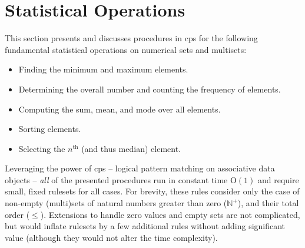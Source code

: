 

\section{Statistical Operations}\label{sec:cps:stats}

This section presents and discusses procedures in \gls{cps} for the following fundamental statistical operations on numerical sets and multisets:
\begin{itemize}
    \item Finding the minimum and maximum elements.
    \item Determining the overall number and counting the frequency of elements.
    \item Computing the sum, mean, and mode over all elements.
    \item Sorting elements.
    \item Selecting the \(n^{\text{th}}\) (and thus median) element.
\end{itemize}

Leveraging the power of \gls{cps} -- logical pattern matching on associative data objects -- \emph{all} of the presented procedures run in constant time O\((1)\) and require small, fixed rulesets for all cases.  For brevity, these rules consider only the case of non-empty (multi)sets of natural numbers greater than zero (\(\mathbb{N}^+\)), and their total order (\(\leq\)).  Extensions to handle zero values and empty sets are not complicated, but would inflate rulesets by a few additional rules without adding significant value (although they would not alter the time complexity).

